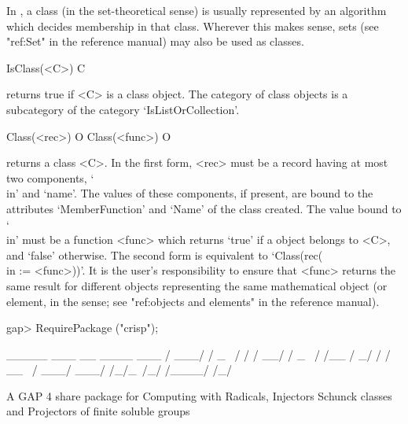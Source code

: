 
In {\CRISP}, a class (in the set-theoretical sense) is usually represented
by an algorithm which decides membership in that class. Wherever this makes
sense, sets (see "ref:Set" in the {\GAP} reference
manual) may also be used as classes.



\>IsClass(<C>) C

returns true if <C> is a class object. The category of class objects is a
subcategory of the category `IsListOrCollection'.

\>Class(<rec>) O
\>Class(<func>) O

returns a class <C>. In the first form, <rec> must be a record having at most
two components, `\\in' and `name'. The values of these components, if
present, are bound to the attributes `MemberFunction' and `Name' of the
class created. The value bound to `\\in' must be a function <func> which
returns `true' if a {\GAP} object belongs to <C>, and `false' otherwise. The
second form is equivalent to `Class(rec(\\in := <func>))'. It is the user's
responsibility to ensure that <func> returns the same result for different
{\GAP} objects representing the same mathematical object (or element, in the
{\GAP} sense; see "ref:objects and elements" in the {\GAP} reference manual).

\beginexample
gap> RequirePackage ("crisp");
                                                   
             _____  ___    __  ____   ___        
            / ___/ / _ \  / / / __/  / _ \       
           / /__  /   _/ / / _\_ \  / ___/       
           \___/ /_/\_\ /_/ /____/ /_/           
                                                    
              A GAP 4 share package for           
          Computing with Radicals, Injectors        
            Schunck classes and Projectors          
               of finite soluble groups             
                                                    
